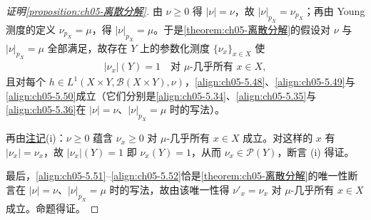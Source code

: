 \documentclass[../../main.tex]{subfiles}%
\begin{document}
\begin{proof}[证明\cref{proposition:ch05-离散分解}]
由 $\nu\geqslant0$ 得 $|\nu|=\nu$，故 $|\nu|_{p_X}=\nu_{p_X}$；再由 Young 测度的定义 $\nu_{p_X}=\mu$，得 $|\nu|_{p_X}=\mu$。于是\cref{theorem:ch05-离散分解}的假设对 $\nu$ 与 $|\nu|_{p_X}=\mu$ 全部满足，故存在 $Y$ 上的参数化测度 $\{\nu_x\}_{x\in X}$ 使
\begin{align*}
|\nu_x|(Y)=1\quad\text{对 }\mu\text{-几乎所有 }x\in X,
\end{align*}
且对每个 $h\in L^1(X\times Y,\mathscr{B}(X\times Y),\nu)$，\eqref{align:ch05-5.48}、\eqref{align:ch05-5.49}与\eqref{align:ch05-5.50}成立（它们分别是\eqref{align:ch05-5.34}、\eqref{align:ch05-5.35}与\eqref{align:ch05-5.36}在 $|\nu|=\nu$、$|\nu|_{p_X}=\mu$ 时的写法）。

再由\hyperref[remark:ch05-离散分解注]{注记}(i)：$\nu\geqslant0$ 蕴含 $\nu_x\geqslant0$ 对 $\mu$-几乎所有 $x\in X$ 成立。对这样的 $x$ 有 $|\nu_x|=\nu_x$，故 $|\nu_x|(Y)=1$ 即 $\nu_x(Y)=1$，从而 $\nu_x\in\mathcal{P}(Y)$，断言 (i) 得证。

最后，\eqref{align:ch05-5.51}--\eqref{align:ch05-5.52}恰是\cref{theorem:ch05-离散分解}的唯一性断言在 $|\nu|=\nu$、$|\nu|_{p_X}=\mu$ 时的写法，故由该唯一性得 $\nu'_x=\nu_x$ 对 $\mu$-几乎所有 $x\in X$ 成立。命题得证。
\end{proof}
\end{document}
